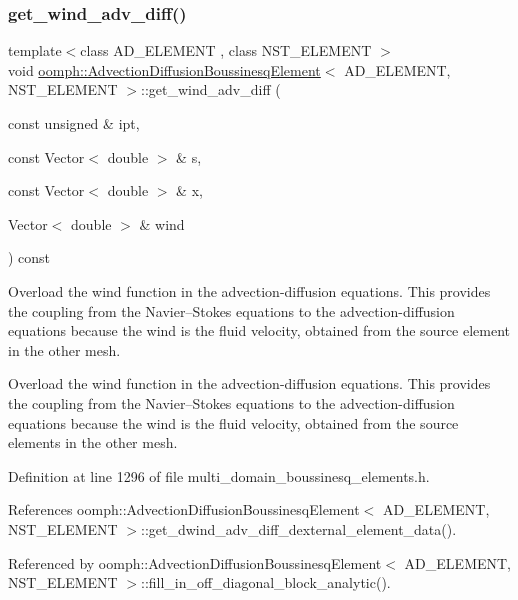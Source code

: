 \subsubsection{\texorpdfstring{get\+\_\+wind\+\_\+adv\+\_\+diff()}{get\_wind\_adv\_diff()}}
{\footnotesize\ttfamily template$<$class A\+D\+\_\+\+E\+L\+E\+M\+E\+NT , class N\+S\+T\+\_\+\+E\+L\+E\+M\+E\+NT $>$ \\
void \hyperlink{classoomph_1_1AdvectionDiffusionBoussinesqElement}{oomph\+::\+Advection\+Diffusion\+Boussinesq\+Element}$<$ A\+D\+\_\+\+E\+L\+E\+M\+E\+NT, N\+S\+T\+\_\+\+E\+L\+E\+M\+E\+NT $>$\+::get\+\_\+wind\+\_\+adv\+\_\+diff (\begin{DoxyParamCaption}\item[{const unsigned \&}]{ipt,  }\item[{const Vector$<$ double $>$ \&}]{s,  }\item[{const Vector$<$ double $>$ \&}]{x,  }\item[{Vector$<$ double $>$ \&}]{wind }\end{DoxyParamCaption}) const}



Overload the wind function in the advection-\/diffusion equations. This provides the coupling from the Navier--Stokes equations to the advection-\/diffusion equations because the wind is the fluid velocity, obtained from the source element in the other mesh. 

Overload the wind function in the advection-\/diffusion equations. This provides the coupling from the Navier--Stokes equations to the advection-\/diffusion equations because the wind is the fluid velocity, obtained from the source elements in the other mesh. 

Definition at line 1296 of file multi\+\_\+domain\+\_\+boussinesq\+\_\+elements.\+h.



References oomph\+::\+Advection\+Diffusion\+Boussinesq\+Element$<$ A\+D\+\_\+\+E\+L\+E\+M\+E\+N\+T, N\+S\+T\+\_\+\+E\+L\+E\+M\+E\+N\+T $>$\+::get\+\_\+dwind\+\_\+adv\+\_\+diff\+\_\+dexternal\+\_\+element\+\_\+data().



Referenced by oomph\+::\+Advection\+Diffusion\+Boussinesq\+Element$<$ A\+D\+\_\+\+E\+L\+E\+M\+E\+N\+T, N\+S\+T\+\_\+\+E\+L\+E\+M\+E\+N\+T $>$\+::fill\+\_\+in\+\_\+off\+\_\+diagonal\+\_\+block\+\_\+analytic().

\mbox{\label{classoomph_1_1AdvectionDiffusionBoussinesqElement_afcb2b136650ecca8fd47eb4278616d29}} 
